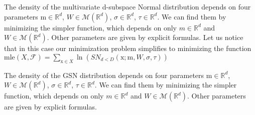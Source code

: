 \documentclass[12pt]{article}
\def\R{\mathbb{R}}
\def\x{\mathrm{x}}
\def\m{\mathrm{m}}
\def\F{\mathcal{F}}
\def\M{\mathcal{M}}
\def\mle{\mathrm{mle}}
\theoremstyle{definition}
\begin{document}
The density of the multivariate d-subspace Normal distribution depends on four parameters $\m \in \R^d$, $W \in \M(\R^d)$, $\sigma \in \R^d$, $\tau \in \R^d$. 
We can find them by minimizing the simpler function, which depends on only  $m \in \R^d$ and $W \in \M(\R^d)$. Other parameters are given by explicit formulas. Let us notice that in this case our minimization problem simplifies to minimizing the function $\mle(X,\F) = \sum \limits_{\x \in X} \ln(SN_{d<D}(\x;\m,W,\sigma,\tau))$

The density of the GSN distribution depends on four parameters $\m \in \R^d$, $W \in \M(\R^d)$, $\sigma \in \R^d$, $\tau \in \R^d$. 
We can find them by minimizing the simpler function, which depends on only  $m \in \R^d$ and $W \in \M(\R^d)$. Other parameters are given by explicit formulas.    
\end{document}
